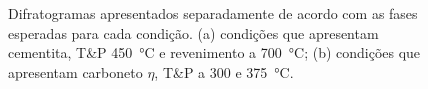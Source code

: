 \begin{figure}
  \centering
  \vspace{0pt}
  \caption{Difratogramas apresentados separadamente de acordo com as fases esperadas para cada condição. (a) condições que apresentam cementita, T\&P \SI{450}{\degreeCelsius} e revenimento a \SI{700}{\degreeCelsius}; (b) condições que apresentam carboneto $\eta$, T\&P a 300 e \SI{375}{\degreeCelsius}.}
  \label{fig:Rayonix_detalhe_separado}
\end{figure}

